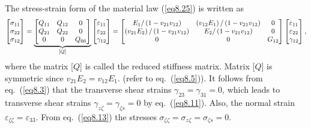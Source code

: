 \documentclass{AeroStructure-ERJohnson}
\begin{document}
\noindent The stress-strain form of the material law (\ref{eq8.25}) is
written as
\begin{align}\label{eq8.27}
\left[\begin{array}{@{}l@{}} \sigma_{11}\\
\sigma_{22}\\
\sigma_{12}
\end{array}\right]=\underbrace{\left[\begin{array}{@{}ccc@{}}
Q_{11} & Q_{12} & 0\\
Q_{21} & Q_{22} & 0\\
0 & 0 & Q_{66}
\end{array}\right]}_{[Q]}\left[\begin{array}{@{}l@{}}
\varepsilon_{11}\\
\varepsilon_{22}\\
\gamma_{12}
\end{array}\right]=\left[\begin{array}{@{}ccc@{}} E_{1}
/\left(1-v_{21} v_{12}\right) & \left(v_{12} E_{1}\right)
/\left(1-v_{21} v_{12}\right) & 0\\
\left(v_{21} E_{2}\right)
/\left(1-v_{21} v_{12}\right) & E_{2}/\left(1-v_{21}
v_{12}\right) & 0\\
0 & 0 & G_{12}
\end{array}\right]\left[\begin{array}{@{}l@{}} \varepsilon_{11}\\
\varepsilon_{22}\\
\gamma_{12} \end{array}\right],
\end{align}
where the matrix [$Q$] is called the reduced stiffness matrix.
Matrix [$Q$] is symmetric since $v_{21} E_{2}=v_{12} E_{1}$.
(refer to eq.~(\ref{eq8.5})). It follows from eq.~(\ref{eq8.3})
that the transverse shear strains $\gamma_{23}=\gamma_{31}=0$,
which leads to transverse shear strains
$\gamma_{z\zeta}=\gamma_{\zeta s}=0$ by eq.~(\ref{eq8.11}). Also,
the normal strain $\varepsilon_{\zeta\zeta}=\varepsilon_{33}$. From
eq.~(\ref{eq8.13}) the stresses $ \sigma_{\zeta \zeta}=\sigma_{z
\zeta}=\sigma_{\zeta s}=0$.
\end{document}
